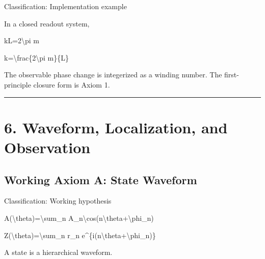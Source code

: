 \documentclass[
  a4paper,
]{article}
\newenvironment{Shaded}{}{}
\newcommand{\NormalTok}[1]{#1}
\begin{document}
Classification: Implementation example

In a closed readout system,

\begin{Shaded}
\begin{Highlighting}[]
\NormalTok{kL=2\textbackslash{}pi m}
\end{Highlighting}
\end{Shaded}

\begin{Shaded}
\begin{Highlighting}[]
\NormalTok{k=\textbackslash{}frac\{2\textbackslash{}pi m\}\{L\}}
\end{Highlighting}
\end{Shaded}

The observable phase change is integerized as a winding number. The
first-principle closure form is Axiom 1.

\begin{center}\rule{0.5\linewidth}{0.5pt}\end{center}

\section{6. Waveform, Localization, and
Observation}\label{waveform-localization-and-observation}

\subsection{Working Axiom A: State
Waveform}\label{working-axiom-a-state-waveform}

Classification: Working hypothesis

\begin{Shaded}
\begin{Highlighting}[]
\NormalTok{A(\textbackslash{}theta)=\textbackslash{}sum\_n A\_n\textbackslash{}cos(n\textbackslash{}theta+\textbackslash{}phi\_n)}
\end{Highlighting}
\end{Shaded}

\begin{Shaded}
\begin{Highlighting}[]
\NormalTok{Z(\textbackslash{}theta)=\textbackslash{}sum\_n r\_n e\^{}\{i(n\textbackslash{}theta+\textbackslash{}phi\_n)\}}
\end{Highlighting}
\end{Shaded}

A state is a hierarchical waveform.
\end{document}
